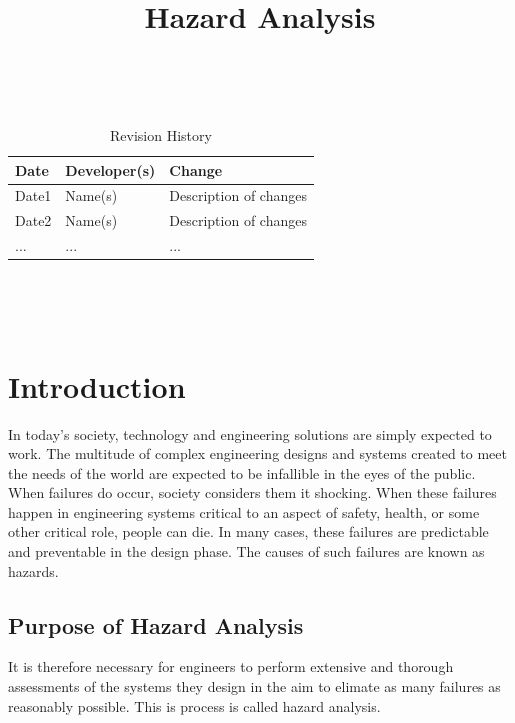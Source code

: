 \documentclass{article}
\title{Hazard Analysis\\\progname}
\author{\authname}
\date{}
\begin{document}
\maketitle
\thispagestyle{empty}

~\newpage


\begin{table}[hp]
	\caption{Revision History} \label{TblRevisionHistory}
	\begin{tabularx}{\textwidth}{llX}
		\toprule
		\textbf{Date} & \textbf{Developer(s)} & \textbf{Change}        \\
		\midrule
		Date1         & Name(s)               & Description of changes \\
		Date2         & Name(s)               & Description of changes \\
		...           & ...                   & ...                    \\
		\bottomrule
	\end{tabularx}
\end{table}

~\newpage

\tableofcontents

~\newpage



\section{Introduction}

In today's society, technology and engineering solutions are simply expected to work. The multitude of complex engineering designs and systems created to meet the needs of the world are expected to be infallible in the eyes of the public. When failures do occur, society considers them it shocking. When these failures happen in engineering systems critical to an aspect of safety, health, or some other critical role, people can die. In many cases, these failures are predictable and preventable in the design phase. The causes of such failures are known as hazards.
\subsection{Purpose of Hazard Analysis}

It is therefore necessary for engineers to perform extensive and thorough assessments of the systems they design in the aim to elimate as many failures as reasonably possible. This is process is called hazard analysis.\\
\end{document}
